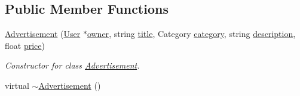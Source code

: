 \subsection*{Public Member Functions}
\begin{DoxyCompactItemize}
\item 
\hyperlink{class_advertisement_aa39584aae7c125c74a9dfe97409ae326}{Advertisement} (\hyperlink{class_user}{User} $\ast$\hyperlink{class_advertisement_a10398131c5aadcd1fdf08d6acabec45f}{owner}, string \hyperlink{class_advertisement_a63b197da6f91139ed6baf700f834a3db}{title}, Category \hyperlink{class_advertisement_af77599e289974c0e4f502db621257fe5}{category}, string \hyperlink{class_advertisement_afb0909f9fceabb44804e06e721ff7fee}{description}, float \hyperlink{class_advertisement_aefd1dddaabd0cfa411e6cbaaf67c4dd5}{price})
\begin{DoxyCompactList}\small\item\em Constructor for class \hyperlink{class_advertisement}{Advertisement}. \end{DoxyCompactList}\item 
\hypertarget{class_advertisement_a49170a22dcd2a8bf88d3ed1aad475b82}{}virtual \hyperlink{class_advertisement_a49170a22dcd2a8bf88d3ed1aad475b82}{$\sim$\+Advertisement} ()\label{class_advertisement_a49170a22dcd2a8bf88d3ed1aad475b82}


\end{DoxyCompactItemize}
